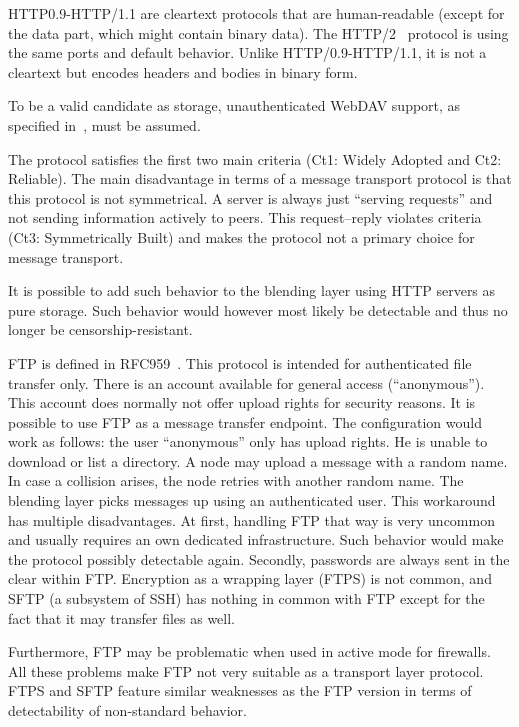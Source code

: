HTTP0.9-HTTP/1.1 are cleartext protocols that are human-readable (except for the data part, which might contain binary data). The HTTP/2~\cite{rfc7540} protocol is using the same ports and default behavior. Unlike HTTP/0.9-HTTP/1.1, it is not a cleartext but encodes headers and bodies in binary form. 

To be a valid candidate as storage, unauthenticated WebDAV support, as specified in~\cite{rfc4918}, must be assumed.

The protocol satisfies the first two main criteria (Ct1: Widely Adopted and Ct2: Reliable). The main disadvantage in terms of a message transport protocol is that this protocol is not symmetrical. A server is always just ``serving requests'' and not sending information actively to peers. This request--reply violates criteria (Ct3: Symmetrically Built) and makes the protocol not a primary choice for message transport. 

It is possible to add such behavior to the blending layer using HTTP servers as pure storage. Such behavior would however most likely be detectable and thus no longer be censorship-resistant.

FTP is defined in RFC959~\cite{rfc959}. This protocol is intended for authenticated file transfer only. There is an account available for general access (``anonymous''). This account does normally not offer upload rights for security reasons. It is possible to use FTP as a message transfer endpoint. The configuration would work as follows: the user ``anonymous'' only has upload rights. He is unable to download or list a directory. A node may upload a message with a random name. In case a collision arises, the node retries with another random name. The blending layer picks messages up using an authenticated user. This workaround has multiple disadvantages. At first, handling FTP that way is very uncommon and usually requires an own dedicated infrastructure. Such behavior would make the protocol possibly detectable again. Secondly, passwords are always sent in the clear within FTP. Encryption as a wrapping layer (FTPS) is not common, and SFTP (a subsystem of SSH) has nothing in common with FTP except for the fact that it may transfer files as well.

Furthermore, FTP may be problematic when used in active mode for firewalls. All these problems make FTP not very suitable as a transport layer protocol. FTPS and SFTP feature similar weaknesses as the FTP version in terms of detectability of non-standard behavior.

